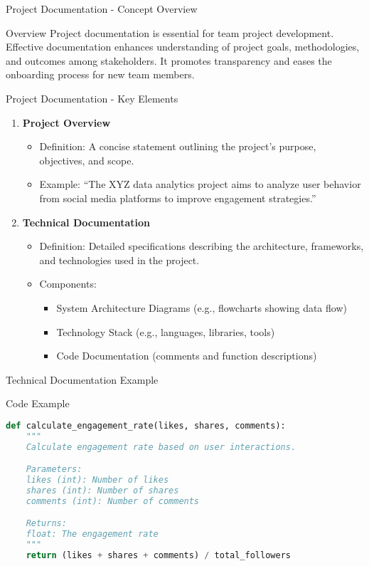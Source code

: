 \documentclass[aspectratio=169]{beamer}
\begin{document}
\begin{frame}[fragile]{Project Documentation - Concept Overview}
    \begin{block}{Overview}
        Project documentation is essential for team project development. Effective documentation enhances understanding of project goals, methodologies, and outcomes among stakeholders. 
        It promotes transparency and eases the onboarding process for new team members.
    \end{block}
\end{frame}

\begin{frame}[fragile]{Project Documentation - Key Elements}
    \begin{enumerate}
        \item \textbf{Project Overview}
            \begin{itemize}
                \item Definition: A concise statement outlining the project's purpose, objectives, and scope. 
                \item Example: “The XYZ data analytics project aims to analyze user behavior from social media platforms to improve engagement strategies.”
            \end{itemize}
        \item \textbf{Technical Documentation}
            \begin{itemize}
                \item Definition: Detailed specifications describing the architecture, frameworks, and technologies used in the project.
                \item Components: 
                    \begin{itemize}
                        \item System Architecture Diagrams (e.g., flowcharts showing data flow)
                        \item Technology Stack (e.g., languages, libraries, tools)
                        \item Code Documentation (comments and function descriptions)
                    \end{itemize}
            \end{itemize}
    \end{enumerate}
\end{frame}

\begin{frame}[fragile]{Technical Documentation Example}
    \begin{block}{Code Example}
        \begin{lstlisting}[language=Python]
def calculate_engagement_rate(likes, shares, comments):
    """
    Calculate engagement rate based on user interactions.

    Parameters:
    likes (int): Number of likes
    shares (int): Number of shares
    comments (int): Number of comments

    Returns:
    float: The engagement rate
    """
    return (likes + shares + comments) / total_followers
        \end{lstlisting}
    \end{block}
\end{frame}
\end{document}
